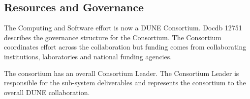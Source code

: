 








  \subsection{Resources and Governance}
  \label{ch:exec-comp-gov}

  The Computing and Software effort is now a DUNE Consortium.  Docdb 12751  describes the governance structure for the Consortium.  The Consortium coordinates effort across the collaboration but funding comes from collaborating institutions, laboratories and national funding agencies.

  The consortium has an overall Consortium Leader. The Consortium Leader is responsible for the sub-system deliverables and represents the consortium to the overall DUNE collaboration.

